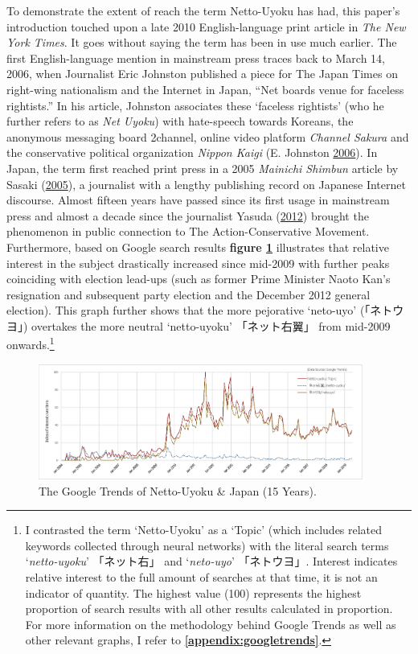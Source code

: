 \documentclass[10pt,british,A4paper,,openany]{memoir}
\begin{document}
To demonstrate the extent of reach the term Netto-Uyoku has had, this
paper's introduction touched upon a late 2010 English-language print
article in \emph{The New York Times}. It goes without saying the term
has been in use much earlier. The first English-language mention in
mainstream press traces back to March 14, 2006, when Journalist Eric
Johnston published a piece for The Japan Times on right-wing nationalism
and the Internet in Japan, ``Net boards venue for faceless rightists.''
In his article, Johnston associates these `faceless rightists' (who he
further refers to as \emph{Net Uyoku}) with hate-speech towards Koreans,
the anonymous messaging board 2channel, online video platform
\emph{Channel Sakura} and the conservative political organization
\emph{Nippon Kaigi} (E. Johnston
\protect\hyperlink{ref-johnston_net_2006}{2006}). In Japan, the term
first reached print press in a 2005 \emph{Mainichi Shimbun} article by
Sasaki (\protect\hyperlink{ref-sasaki_netto-uyoku_2005}{2005}), a
journalist with a lengthy publishing record on Japanese Internet
discourse. Almost fifteen years have passed since its first usage in
mainstream press and almost a decade since the journalist Yasuda
(\protect\hyperlink{ref-yasuda_eng:_2012}{2012}) brought the phenomenon
in public connection to The Action-Conservative Movement. Furthermore,
based on Google search results \textbf{figure \ref{fig:nettouyoku}}
illustrates that relative interest in the subject drastically increased
since mid-2009 with further peaks coinciding with election lead-ups
(such as former Prime Minister Naoto Kan's resignation and subsequent
party election and the December 2012 general election). This graph
further shows that the more pejorative `neto-uyo' (「ネトウヨ」)
overtakes the more neutral `netto-uyoku' 「ネット右翼」 from mid-2009
onwards.\footnote{I contrasted the term `Netto-Uyoku' as a `Topic'
  (which includes related keywords collected through neural networks)
  with the literal search terms `\emph{netto-uyoku}' 「ネット右」 and
  `\emph{neto-uyo}' 「ネトウヨ」. Interest indicates relative interest
  to the full amount of searches at that time, it is not an indicator of
  quantity. The highest value (100) represents the highest proportion of
  search results with all other results calculated in proportion. For
  more information on the methodology behind Google Trends as well as
  other relevant graphs, I refer to
  \textbf{\ref{appendix:googletrends}}.}

\begin{figure}[!htb]
 \centering
  \caption{\label{fig:nettouyoku} The Google Trends of Netto-Uyoku \& Japan (15 Years).}
 \includegraphics[width=0.95\textwidth,trim=4 4 4 4,clip]{images/nettouyoku.eps}
\end{figure}
\end{document}
